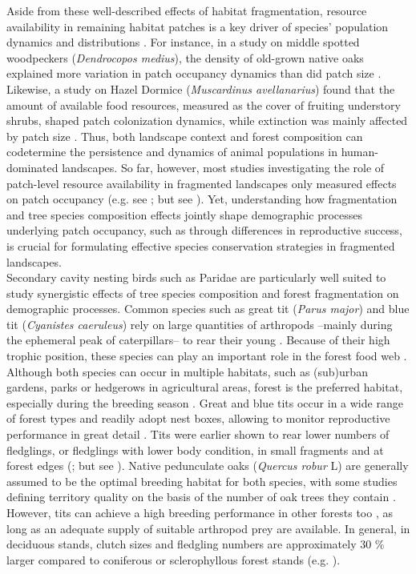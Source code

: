 \documentclass[10pt, twoside]{book} %
\begin{document}
Aside from these well-described effects of habitat fragmentation, resource availability in remaining habitat patches is a key driver of species' population dynamics and distributions \citep{Mortelliti2010}. For instance, in a study on middle spotted woodpeckers (\textit{Dendrocopos medius}), the density of old-grown native oaks explained more variation in patch occupancy dynamics than did patch size \citep{Robles2012}. Likewise, a study on Hazel Dormice (\textit{Muscardinus avellanarius}) found that the amount of available food resources, measured as the cover of fruiting understory shrubs, shaped patch colonization dynamics, while extinction was mainly affected by patch size \citep{Mortelliti2014}. Thus, both landscape context and forest composition can codetermine the persistence and dynamics of animal populations in human-dominated landscapes. So far, however, most studies investigating the role of patch-level resource availability in fragmented landscapes only measured effects on patch occupancy (e.g. see \citealt{Franken2004, Vogeli2010, Robles2012, Cunningham2016}; but see \citealt{Mortelliti2014}). Yet, understanding how fragmentation and tree species composition effects jointly shape demographic processes underlying patch occupancy, such as through differences in reproductive success, is crucial for formulating effective species conservation strategies in fragmented landscapes.\\

Secondary cavity nesting birds such as Paridae are particularly well suited to study synergistic effects of tree species composition and forest fragmentation on demographic processes. Common species such as great tit (\textit{Parus major}) and blue tit (\textit{Cyanistes caeruleus}) rely on large quantities of arthropods --mainly during the ephemeral peak of caterpillars-- to rear their young \citep{Ceia2016}. Because of their high trophic position, these species can play an important role in the forest food web \citep{Sanz2001, Dekeukeleire2019}. Although both species can occur in multiple habitats, such as (sub)urban gardens, parks or hedgerows in agricultural areas, forest is the preferred habitat, especially during the breeding season \citep{Gosler1993, Stenning2018}. Great and blue tits occur in a wide range of forest types and readily adopt nest boxes, allowing to monitor reproductive performance in great detail \citep{Lambrechts2010}. Tits were earlier shown to rear lower numbers of fledglings, or fledglings with lower body condition, in small fragments and at forest edges (\citealt{Hinsley2009, Wilkin2009, Bueno-Enciso2016}; but see \citealt{Nour1998}). Native pedunculate oaks (\textit{Quercus robur} L) are generally assumed to be the optimal breeding habitat for both species, with some studies defining territory quality on the basis of the number of oak trees they contain \citep{Wilkin2007, Bell2014}. However, tits can achieve a high breeding performance in other forests too \citep{Shutt2018}, as long as an adequate supply of suitable arthropod prey are available. In general, in deciduous stands, clutch sizes and fledgling numbers are approximately 30 \% larger compared to coniferous or sclerophyllous forest stands (e.g. \citealt{VanBalen1973, Lambrechts2004, Tremblay2005}).\\
\end{document}

